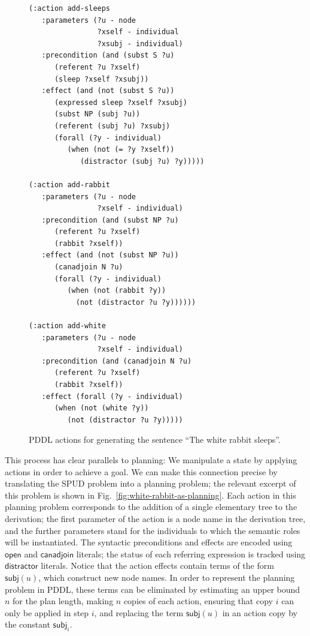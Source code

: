 \begin{figure}[t]
\centering
{\small%
\begin{verbatim}
(:action add-sleeps
   :parameters (?u - node
                ?xself - individual
                ?xsubj - individual)
   :precondition (and (subst S ?u)
      (referent ?u ?xself)
      (sleep ?xself ?xsubj))
   :effect (and (not (subst S ?u))
      (expressed sleep ?xself ?xsubj)
      (subst NP (subj ?u))
      (referent (subj ?u) ?xsubj)
      (forall (?y - individual)
         (when (not (= ?y ?xself))
            (distractor (subj ?u) ?y)))))

(:action add-rabbit
   :parameters (?u - node
                ?xself - individual)
   :precondition (and (subst NP ?u)
      (referent ?u ?xself)
      (rabbit ?xself))
   :effect (and (not (subst NP ?u))
      (canadjoin N ?u)
      (forall (?y - individual)
         (when (not (rabbit ?y))
           (not (distractor ?u ?y))))))

(:action add-white
   :parameters (?u - node
                ?xself - individual)
   :precondition (and (canadjoin N ?u)
      (referent ?u ?xself)
      (rabbit ?xself))
   :effect (forall (?y - individual)
      (when (not (white ?y))
         (not (distractor ?u ?y)))))
\end{verbatim}}%
\caption{PDDL actions for generating the sentence ``The white rabbit
sleeps''.}
\label{fig:pddl-crisp}
\end{figure}


This process has clear parallels to planning: We manipulate a state by
applying actions in order to achieve a goal.  We can make this
connection precise by translating the SPUD problem into a planning
problem; the relevant excerpt of this problem is shown in
Fig.~\ref{fig:white-rabbit-as-planning}.  Each action in this planning
problem corresponds to the addition of a single elementary tree to the
derivation; the first parameter of the action is a node name in the
derivation tree, and the further parameters stand for the individuals
to which the semantic roles will be instantiated.  The syntactic
preconditions and effects are encoded using $\mathsf{open}$ and
$\mathsf{canadjoin}$ literals; the status of each referring expression
is tracked using $\mathsf{distractor}$ literals.  Notice that the
action effects contain terms of the form $\mathsf{subj}(u)$, which
construct new node names.  In order to represent the planning problem
in PDDL, these terms can be eliminated by estimating an upper bound
$n$ for the plan length, making $n$ copies of each action, ensuring
that copy $i$ can only be applied in step $i$, and replacing the term
$\mathsf{subj}(u)$ in an action copy by the constant
$\mathsf{subj}_i$.

